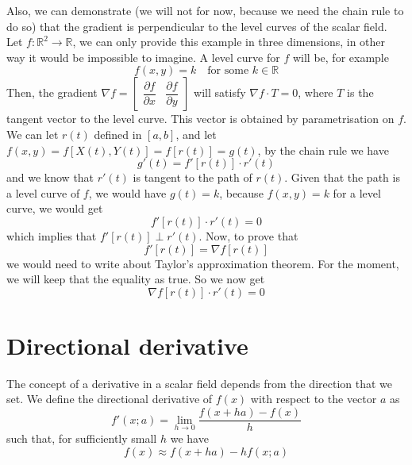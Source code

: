 \documentclass[../linear-spaces.tex]{subfiles}
\begin{document}
Also, we can demonstrate (we will not for now, because we need the chain rule to do so) that the gradient is perpendicular to the 
level curves of the scalar field. Let $f: \mathbb{R}^{2} \to \mathbb{R}$, we can only provide this example in three dimensions, 
in other way it would be impossible to imagine. A level curve for $f$ will be, for example 
\begin{equation}
    f(x,y)=k\quad \text{for some } k \in \mathbb{R}
\end{equation}
Then, the gradient $\nabla f = \begin{bmatrix}  \dfrac{\partial f}{\partial x} &  \dfrac{\partial f}{\partial y} \end{bmatrix}$ will 
satisfy $\nabla f \cdot T = 0$, where $T$ is the tangent vector to the level curve. This vector is obtained by parametrisation on 
$f$. We can let $r(t)$ defined in $[a,b]$, and let $f(x,y) = f\left[X(t), Y(t)\right] = f\left[r(t)\right] = g(t)$, by the chain rule 
we have 
\begin{equation}
    g'(t) = f'\left[r(t)\right]\cdot r'(t)
\end{equation}
and we know that $r'(t)$ is tangent to the path of $r(t)$. Given that the path is a level curve of $f$, we would have $g(t) = k$, because 
$f(x,y) = k$ for a level curve, we would get 
 \begin{equation}
    f'\left[r(t)\right]\cdot r'(t) = 0
\end{equation}
which implies that $f'\left[r(t)\right] \perp r'(t)$. Now, to prove that 
\begin{equation}
    f'\left[r(t)\right] = \nabla f[r(t)]
\end{equation}
we would need to write about Taylor's approximation theorem. For the moment, we will keep that the equality as true. So we now get 
\begin{equation}
    \nabla f \left[r(t)\right] \cdot r'(t) = 0
\end{equation} 

\section{Directional derivative}

The concept of a derivative in a scalar field depends from the direction that we set. We define 
the directional derivative of $f(x)$ with respect to the vector $a$ as 
\begin{equation}
    f'(x; a) = \lim_{h\to 0}\dfrac{f(x + ha) - f(x)}{h}
\end{equation}
such that, for sufficiently small $h$ we have 
\begin{equation}
    f(x) \approx f(x+ha) - h f(x; a)
\end{equation}
\end{document}
